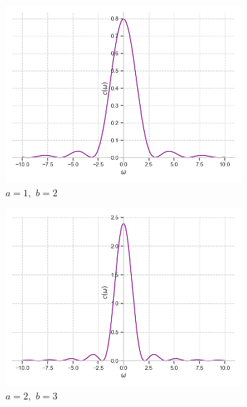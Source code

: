 \documentclass[a4paper, 16pt]{article}
\begin{document}
    \begin{figure}[htbp]
        \centering
        \begin{subfigure}{0.3\textwidth}
            \centering
            \includegraphics[width=\linewidth]{trifimg_a=1_b=2.png}
            \caption{$a=1,\,\,b=2$}
            \label{fig:trifimg_1}
        \end{subfigure}
        \hfill
        \begin{subfigure}{0.3\textwidth}
            \centering
            \includegraphics[width=\linewidth]{trifimg_a=2_b=3.png}
            \caption{$a=2,\,\,b=3$}
            \label{fig:trifimg_2}
        \end{subfigure}
        \hfill
        \begin{subfigure}{0.3\textwidth}

\end{subfigure}
\end{figure}
\end{document}
